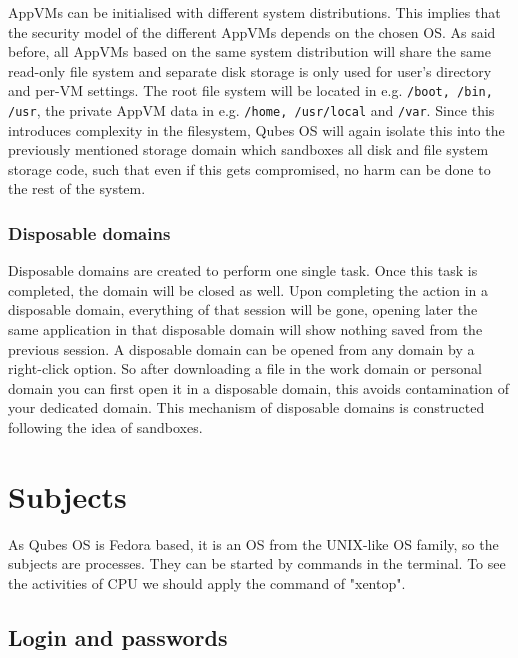 \documentclass[runningheads,a4paper]{article}
\begin{document}
AppVMs can be initialised with different system
distributions. This implies that the security model of the different 
AppVMs depends on the chosen OS. As said before, all AppVMs
based on the same system distribution will share the same read-only
file system and separate disk storage is only used for user's
directory and per-VM settings. The root file system will be located in
e.g. \texttt{/boot, /bin, /usr}, the private AppVM data in
e.g. \texttt{/home, /usr/local} and \texttt{/var}. 
Since this introduces complexity in the
filesystem, Qubes OS will again isolate this into the previously
mentioned storage domain which sandboxes
all disk and file system storage code, such that even if this gets
compromised, no harm can be done to the rest of the system.

\subsubsection{Disposable domains}

Disposable domains are created to perform one single task. Once this
task is completed, the domain will be closed as well. Upon completing
the action in a disposable domain, everything of that session will be
gone, opening later the same application in that disposable domain
will show nothing saved from the previous session. A disposable domain
can be opened from any domain by a right-click option. So after
downloading a file in the work domain or personal domain you can first
open it in a disposable domain, this avoids contamination of your
dedicated domain. This mechanism of disposable domains is constructed
following the idea of sandboxes.


\section{Subjects}

As Qubes OS is Fedora based, it is an OS from the UNIX-like OS family,
so the
subjects are processes. They can be started by commands in the
terminal. To see the activities of CPU we should apply the command of
"xentop". 

\subsection{Login and passwords} 
\end{document}
